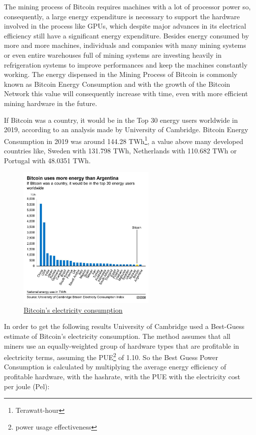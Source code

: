 \documentclass{article}
\newcommand\tab[1][1cm]{\hspace*{#1}}
\begin{document}
\tab The mining process of Bitcoin requires machines with a lot of processor power so, consequently, a large energy expenditure is necessary to support the hardware involved in the process like GPUs, which despite major advances in its electrical efficiency still have a significant energy expenditure. Besides energy consumed by more and more machines, individuals and companies with many mining systems or even entire warehouses full of mining systems are investing heavily in refrigeration systems to improve performances and keep the machines constantly working. The energy dispensed in the Mining Process of Bitcoin is commonly known as Bitcoin Energy Consumption and with the growth of the Bitcoin Network this value will consequently increase with time, even with more efficient mining hardware in the future.

If Bitcoin was a country, it would be in the Top 30 energy users worldwide in 2019, according to an analysis made by University of Cambridge. Bitcoin Energy Consumption in 2019 was around 144.28 TWh\footnote{Terawatt-hour}, a value above many developed countries like, Sweden with 131.798 TWh, Netherlands with 110.682 TWh or Portugal with 48.0351 TWh.

\begin{figure}[H]
    \begin{center}
        \includegraphics[width=0.6\textwidth]{images/bitcoin_costs.png}
        \caption{\href{https://www.bbc.com/news/technology-56012952}{\underline{Bitcoin’s electricity consumption}}}
    \end{center}
\end{figure}

In order to  get the following results University of Cambridge used a Best-Guess estimate of Bitcoin’s electricity consumption. The method assumes that all miners use an equally-weighted group of hardware types that are profitable in electricity terms, assuming the PUE\footnote{power usage effectiveness} of 1.10. So the Best Guess Power Consumption is calculated by multiplying the average energy efficiency of profitable hardware, with the hashrate, with the PUE with the electricity cost per joule (Pel):
\end{document}
